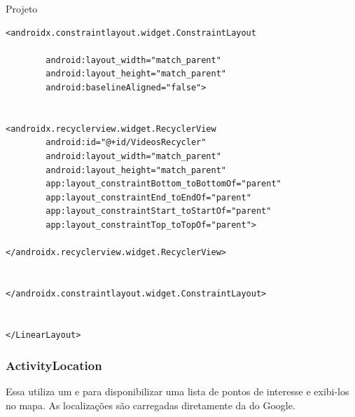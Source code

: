 \documentclass[
	12pt,				%
	openright,			%
	twoside,			%
	a4paper,			%
	english,			%
	french,				%
	spanish,			%
	brazil				%
	]{abntex2}
\begin{document}
\begin{chapter}{Projeto}
\begin{lstlisting}[numbers=none,basicstyle=\small,
caption={FragmentVideos.xml},
title={FragmentVideos.xml},
label={FragmentVideos.xml}]
<androidx.constraintlayout.widget.ConstraintLayout

		android:layout_width="match_parent"
		android:layout_height="match_parent"
		android:baselineAligned="false">


<androidx.recyclerview.widget.RecyclerView
		android:id="@+id/VideosRecycler"
		android:layout_width="match_parent"
		android:layout_height="match_parent"
		app:layout_constraintBottom_toBottomOf="parent"
		app:layout_constraintEnd_toEndOf="parent"
		app:layout_constraintStart_toStartOf="parent"
		app:layout_constraintTop_toTopOf="parent">

</androidx.recyclerview.widget.RecyclerView>


</androidx.constraintlayout.widget.ConstraintLayout>


</LinearLayout>
\end{lstlisting}

\newpage
\subsubsection{ActivityLocation}
Essa  utiliza um  e  para disponibilizar uma lista de pontos de interesse e exibi-los no mapa. As localizações são carregadas diretamente da  do Google.


\end{chapter}
\end{document}
